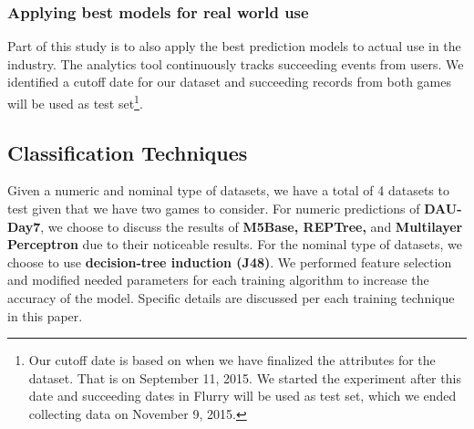 \subsubsection{Applying best models for real world use}
Part of this study is to also apply the best prediction models to actual use in the industry. The analytics tool continuously tracks succeeding events from users. We identified a cutoff date for our dataset and succeeding records from both games will be used as test set\footnote{Our cutoff date is based on when we have finalized the attributes for the dataset. That is on September 11, 2015. We started the experiment after this date and succeeding dates in Flurry will be used as test set, which we ended collecting data on November 9, 2015.}.

\subsection{Classification Techniques}
Given a numeric and nominal type of datasets, we have a total of 4 datasets to test given that we have two games to consider. For numeric predictions of \textbf{DAU-Day7}, we choose to discuss the results of \textbf{M5Base, REPTree,} and \textbf{Multilayer Perceptron} due to their noticeable results. For the nominal type of datasets, we choose to use \textbf{decision-tree induction (J48)}. We performed feature selection and modified needed parameters for each training algorithm to increase the accuracy of the model. Specific details are discussed per each training technique in this paper.

